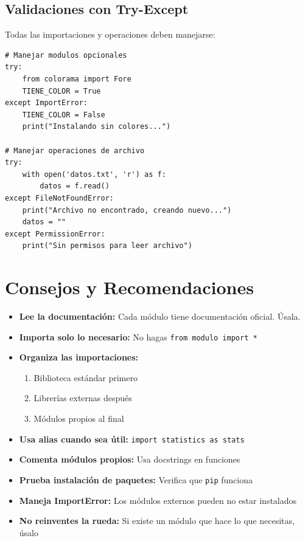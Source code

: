 \documentclass[12pt,a4paper]{article}
\begin{document}
\subsection{Validaciones con Try-Except}

Todas las importaciones y operaciones deben manejarse:

\begin{lstlisting}
# Manejar modulos opcionales
try:
    from colorama import Fore
    TIENE_COLOR = True
except ImportError:
    TIENE_COLOR = False
    print("Instalando sin colores...")

# Manejar operaciones de archivo
try:
    with open('datos.txt', 'r') as f:
        datos = f.read()
except FileNotFoundError:
    print("Archivo no encontrado, creando nuevo...")
    datos = ""
except PermissionError:
    print("Sin permisos para leer archivo")
\end{lstlisting}

\section{Consejos y Recomendaciones}

\begin{itemize}[leftmargin=*]
    \item \textbf{Lee la documentación:} Cada módulo tiene documentación oficial. Úsala.
    
    \item \textbf{Importa solo lo necesario:} No hagas \texttt{from modulo import *}
    
    \item \textbf{Organiza las importaciones:}
    \begin{enumerate}
        \item Biblioteca estándar primero
        \item Librerías externas después
        \item Módulos propios al final
    \end{enumerate}
    
    \item \textbf{Usa alias cuando sea útil:} \texttt{import statistics as stats}
    
    \item \textbf{Comenta módulos propios:} Usa docstrings en funciones
    
    \item \textbf{Prueba instalación de paquetes:} Verifica que \texttt{pip} funciona
    
    \item \textbf{Maneja ImportError:} Los módulos externos pueden no estar instalados
    
    \item \textbf{No reinventes la rueda:} Si existe un módulo que hace lo que necesitas, úsalo
\end{itemize}
\end{document}
